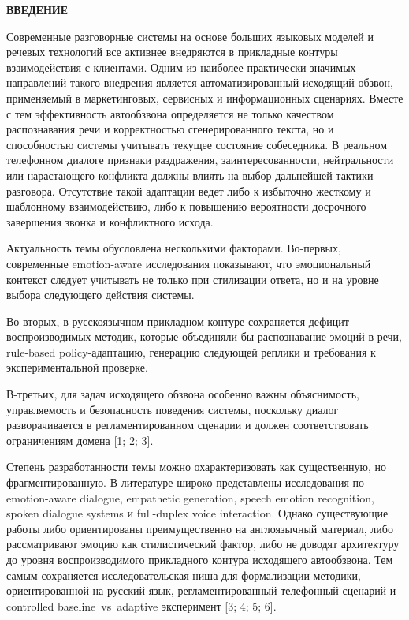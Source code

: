 \documentclass[a4paper,14pt]{extarticle}
\newcommand{\VkrStructuralSection}[1]{%
  \FloatBarrier
  \clearpage
  \phantomsection
  \addcontentsline{toc}{section}{#1}%
  \begin{center}\bfseries #1\end{center}%
  \par\nopagebreak\vspace{12pt}%
}
\renewcommand{\texttt}[1]{\textnormal{#1}}
\begin{document}
\VkrStructuralSection{ВВЕДЕНИЕ}\label{ux432ux432ux435ux434ux435ux43dux438ux435}

Современные разговорные системы на основе больших языковых моделей и
речевых технологий все активнее внедряются в прикладные контуры
взаимодействия с клиентами. Одним из наиболее практически значимых
направлений такого внедрения является автоматизированный исходящий
обзвон, применяемый в маркетинговых, сервисных и информационных
сценариях. Вместе с тем эффективность автообзвона определяется не только
качеством распознавания речи и корректностью сгенерированного текста, но
и способностью системы учитывать текущее состояние собеседника. В
реальном телефонном диалоге признаки раздражения, заинтересованности,
нейтральности или нарастающего конфликта должны влиять на выбор
дальнейшей тактики разговора. Отсутствие такой адаптации ведет либо к
избыточно жесткому и шаблонному взаимодействию, либо к повышению
вероятности досрочного завершения звонка и конфликтного исхода.

Актуальность темы обусловлена несколькими факторами. Во-первых,
современные emotion-aware исследования показывают, что эмоциональный
контекст следует учитывать не только при стилизации ответа, но и на
уровне выбора следующего действия системы.

Во-вторых, в русскоязычном прикладном контуре сохраняется дефицит
воспроизводимых методик, которые объединяли бы распознавание эмоций в
речи, rule-based policy-адаптацию, генерацию следующей реплики и
требования к экспериментальной проверке.

В-третьих, для задач исходящего обзвона особенно важны объяснимость,
управляемость и безопасность поведения системы, поскольку диалог
разворачивается в регламентированном сценарии и должен соответствовать
ограничениям домена {[}1; 2; 3{]}.

Степень разработанности темы можно охарактеризовать как существенную, но
фрагментированную. В литературе широко представлены исследования по
emotion-aware dialogue, empathetic generation, speech emotion
recognition, spoken dialogue systems и full-duplex voice interaction.
Однако существующие работы либо ориентированы преимущественно на
англоязычный материал, либо рассматривают эмоцию как стилистический
фактор, либо не доводят архитектуру до уровня воспроизводимого
прикладного контура исходящего автообзвона. Тем самым сохраняется
исследовательская ниша для формализации методики, ориентированной на
русский язык, регламентированный телефонный сценарий и controlled
\texttt{baseline\ vs\ adaptive} эксперимент {[}3; 4; 5; 6{]}.
\end{document}
